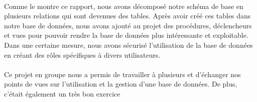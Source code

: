 \paragraph{}{
    Comme le montre ce rapport, nous avons décomposé notre schéma de base en plusieurs relations qui sont devenues des tables. Après avoir créé ces tables dans notre base de données, nous avons ajouté au projet des procédures, déclencheurs et vues pour pouvoir rendre la base de données plus intéressante et exploitable. Dans une certaine mesure, nous avons sécurisé l'utilisation de la base de données en créant des rôles spécifiques à divers utilisateurs. 
}

\paragraph{}{
    Ce projet en groupe nous a permis de travailler à plusieurs et d'échanger nos points de vues sur l'utilisation et la gestion d'une base de données. De plus, c'était également un très bon exercice 
}